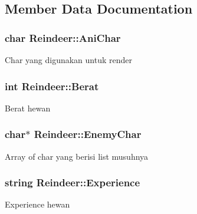 \subsection{Member Data Documentation}
\subsubsection[{\texorpdfstring{Ani\+Char}{AniChar}}]{\setlength{\rightskip}{0pt plus 5cm}char Reindeer\+::\+Ani\+Char\hspace{0.3cm}{\ttfamily [protected]}}\hypertarget{class_reindeer_ac7a242c70bb7a11f259c9f407b9292fe}{}\label{class_reindeer_ac7a242c70bb7a11f259c9f407b9292fe}
Char yang digunakan untuk render 
\subsubsection[{\texorpdfstring{Berat}{Berat}}]{\setlength{\rightskip}{0pt plus 5cm}int Reindeer\+::\+Berat\hspace{0.3cm}{\ttfamily [protected]}}\hypertarget{class_reindeer_a27cffba68365841555697334a54aefe8}{}\label{class_reindeer_a27cffba68365841555697334a54aefe8}
Berat hewan 
\subsubsection[{\texorpdfstring{Enemy\+Char}{EnemyChar}}]{\setlength{\rightskip}{0pt plus 5cm}char$\ast$ Reindeer\+::\+Enemy\+Char\hspace{0.3cm}{\ttfamily [protected]}}\hypertarget{class_reindeer_a4d6fcc03d3596875e9ff3fe7a4c824fc}{}\label{class_reindeer_a4d6fcc03d3596875e9ff3fe7a4c824fc}
Array of char yang berisi list musuhnya 
\subsubsection[{\texorpdfstring{Experience}{Experience}}]{\setlength{\rightskip}{0pt plus 5cm}string Reindeer\+::\+Experience\hspace{0.3cm}{\ttfamily [protected]}}\hypertarget{class_reindeer_afd7f929fb6835b031d1a8effd2c4fca7}{}\label{class_reindeer_afd7f929fb6835b031d1a8effd2c4fca7}
Experience hewan 
